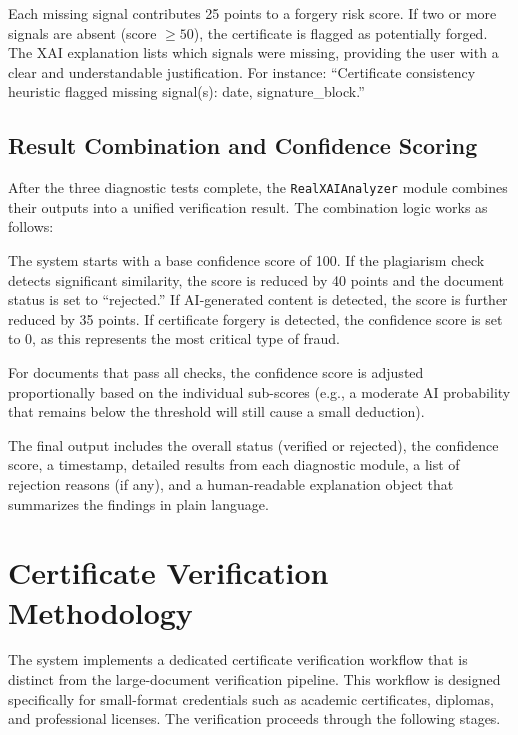     Each missing signal contributes 25 points to a forgery risk score. If two or more signals are absent (score $\geq 50$), the certificate is flagged as potentially forged. The XAI explanation lists which signals were missing, providing the user with a clear and understandable justification. For instance: ``Certificate consistency heuristic flagged missing signal(s): date, signature\_block.''

    \subsection{Result Combination and Confidence Scoring}
    \label{sec:result_comb_score}
    
    After the three diagnostic tests complete, the \texttt{RealXAIAnalyzer} module combines their outputs into a unified verification result. The combination logic works as follows:
    
    The system starts with a base confidence score of 100. If the plagiarism check detects significant similarity, the score is reduced by 40 points and the document status is set to ``rejected.'' If AI-generated content is detected, the score is further reduced by 35 points. If certificate forgery is detected, the confidence score is set to 0, as this represents the most critical type of fraud.
    
    For documents that pass all checks, the confidence score is adjusted proportionally based on the individual sub-scores (e.g., a moderate AI probability that remains below the threshold will still cause a small deduction).
    
    The final output includes the overall status (verified or rejected), the confidence score, a timestamp, detailed results from each diagnostic module, a list of rejection reasons (if any), and a human-readable explanation object that summarizes the findings in plain language.


\section{Certificate Verification Methodology}
\label{sec:certificate_verification_method}

    The system implements a dedicated certificate verification workflow that is distinct from the large-document verification pipeline. This workflow is designed specifically for small-format credentials such as academic certificates, diplomas, and professional licenses. The verification proceeds through the following stages.

